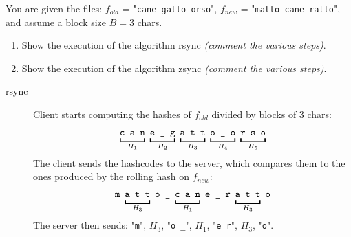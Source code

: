 \exercise

You are given the files: $f_{old}$ = "\texttt{cane gatto orso}", $f_{new}$ =
"\texttt{matto cane ratto}", and assume a block size $B = 3$ chars.

\begin{enumerate}

  \item Show the execution of the algorithm rsync \emph{(comment the various
  steps)}.

  \item Show the execution of the algorithm zsync \emph{(comment the various
  steps)}.

\end{enumerate}

\solution


\begin{description}

  \item[rsync] Client starts computing the hashes of $f_{old}$ divided by blocks
  of 3 chars:
  \begin{align*}
    \underbracket{\vphantom{\tt g}\texttt{c a n}}_{H_1}\
    \underbracket{\texttt{e \_ g}}_{H_2}\
    \underbracket{\vphantom{\tt g}\texttt{a t t}}_{H_3}\
    \underbracket{\vphantom{\tt g}\texttt{o \_ o}}_{H_4}\
    \underbracket{\vphantom{\tt g}\texttt{r s o}}_{H_5}
  \end{align*}
  The client sends the hashcodes to the server, which compares them to the ones
  produced by the rolling hash on $f_{new}$:
  \begin{align*}
    \texttt{m}\
    \underbracket{\vphantom{\tt g}\texttt{a t t}}_{H_3}\ \texttt{o \_}\
    \underbracket{\vphantom{\tt g}\texttt{c a n}}_{H_1}\ \texttt{e \_ r}\
    \underbracket{\vphantom{\tt g}\texttt{a t t}}_{H_3}\ \texttt{o}
  \end{align*}
  The server then sends: "\texttt{m}", $H_3$, "\texttt{o \_}", $H_1$, "\texttt{e
  r}", $H_3$, "\texttt{o}".


\end{description}
